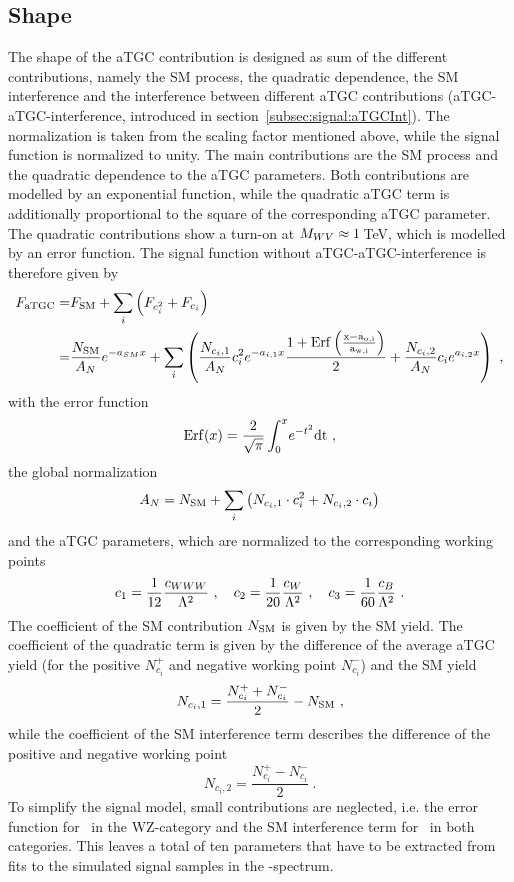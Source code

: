 \subsection*{Shape}
The shape of the aTGC contribution is designed as sum of the different contributions, namely the SM process, the quadratic dependence, the SM interference and the interference between different aTGC contributions (aTGC-aTGC-interference, introduced in section~\ref{subsec:signal:aTGCInt}). The normalization is taken from the scaling factor mentioned above, while the signal function is normalized to unity. The main contributions are the SM process and the quadratic dependence to the aTGC parameters. Both contributions are modelled by an exponential function, while the quadratic aTGC term is additionally proportional to the square of the corresponding aTGC parameter. The quadratic contributions show a turn-on at $M_{WV} \approx 1$\,TeV, which is modelled by an error function. The signal function without aTGC-aTGC-interference is therefore given by
\begin{align}
F_{\rm aTGC} =& F_{\rm SM} + \sum_i \left( F_{c_i^2} + F_{c_i} \right) \\
=& \frac{N_{\rm SM}}{A_N} e^{-a_{SM}x} + \sum_i \left( \frac{N_{c_i,1}}{A_N} c_i^2 e^{-a_{i,1} x} \frac{1+\rm{Erf}\left(\frac{x-a_{o,i}}{a_{w,i}}\right)}{2} + \frac{N_{c_i,2}}{A_N} c_i e^{a_{i,2}x} \right)  ~,
\label{eq:signal:sigfunc}
\end{align}
with the error function
\begin{equation}
{\rm Erf}(x) = \frac{2}{\sqrt{\pi}}\int_0^x \! e^{-t^2}{\rm dt} ~,
\end{equation}
the global normalization
\begin{equation}
A_N = N_{\rm SM} + \sum_i \left( N_{c_i,1}\cdot c_i^2 + N_{c_i,2}\cdot c_i \right) 
\label{eq:signal:globnorm}
\end{equation} 
and the aTGC parameters, which are normalized to the corresponding working points
\begin{equation}
c_1 = \frac{1}{12}\frac{c_{WWW}}{\Lambda^2} ~ , \quad c_2 = \frac{1}{20}\frac{c_{W}}{\Lambda^2} ~ , \quad c_3 = \frac{1}{60}\frac{c_{B}}{\Lambda^2} ~.
\end{equation}
The coefficient of the SM contribution $N_{\rm SM}$ is given by the SM yield. The coefficient of the quadratic term is given by the difference of the average aTGC yield (for the positive $N_{c_i}^{+}$ and negative working point $N_{c_i}^{-}$) and the SM yield
\begin{equation}
N_{c_i,1} = \frac{N_{c_i}^{+}+N_{c_i}^{-}}{2}-N_{\rm SM} ~,
\label{eq:signal:n1}
\end{equation}
while the coefficient of the SM interference term describes the difference of the positive and negative working point
\begin{equation}
N_{c_i,2} = \frac{N_{c_i}^{+}-N_{c_i}^{-}}{2} ~.
\label{eq:signal:n2}
\end{equation}
To simplify the signal model, small contributions are neglected, i.e. the error function for \Tcb \ in the WZ-category and the SM interference term for \Tcwww \ in both categories. This leaves a total of ten parameters that have to be extracted from fits to the simulated signal samples in the \MWV -spectrum.\\

